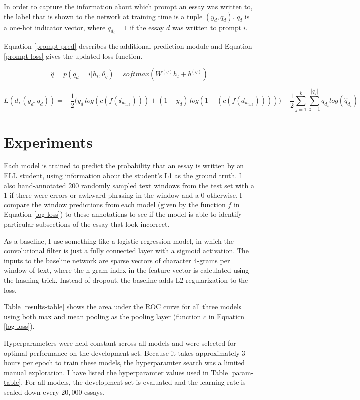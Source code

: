 \documentclass{article} %
\begin{document}
In order to capture the information about which prompt an essay was written to,
the label that is shown to the network at training time is a tuple
$(y_d, q_d)$. $q_d$ is a one-hot indicator vector, where $q_{d_i}=1$
if the essay $d$ was written to prompt $i$.

Equation \ref{prompt-pred} describes the additional prediction module and
Equation \ref{prompt-loss} gives the updated loss function.

\begin{equation} \label{prompt-pred}
\hat{q} = p(q_d=i | h_t, \theta_q) = softmax(W^{(q)} h_t + b^{(q)})
\end{equation}

\begin{equation} \label{prompt-loss}
L(d, (y_d, q_d)) = -\frac{1}{2}\Big( y_d\, log(c(f(d_{w_{1:k}}))) + (1 - y_d)\, log(1 - (c(f(d_{w_{1:k}})))) \Big) - \frac{1}{2}\sum_{j=1}^k \sum_{z=1}^{|q_d|} q_{d_z} log(\hat{q}_{d_z})
\end{equation}

\section{Experiments} \label{experiments}

Each model is trained to predict the probability that an essay is written by
an ELL student, using information about the student's L1 as the ground truth.
I also hand-annotated $200$ randomly sampled text windows from the test set with
a $1$ if there were errors or awkward phrasing in the window and a $0$ otherwise.
I compare the window predictions from each model (given by the function $f$ in
Equation \ref{log-loss}) to these annotations to see if the model is able to
identify particular subsections of the essay that look incorrect.

As a baseline, I use something like a logistic regression model, in which
the convolutional filter is just a fully connected layer with a sigmoid activation.
The inputs to the baseline network are sparse vectors of character 4-grams per
window of text, where the n-gram index in the feature vector is calculated using
the hashing trick. Instead of dropout, the baseline adds L2 regularization to
the loss.

Table \ref{results-table} shows the area under the ROC curve for all three models
using both max and mean pooling as the pooling layer (function $c$ in Equation
\ref{log-loss}).

Hyperparameters were held constant across all models and were selected for
optimal performance on the development set. Because it takes approximately 3
hours per epoch to train these models, the hyperparamter search was a limited
manual exploration. I have listed the hyperparamter values used in Table
\ref{param-table}. For all models, the development set is evaluated and the
learning rate is scaled down every $20,000$ essays.
\end{document}
